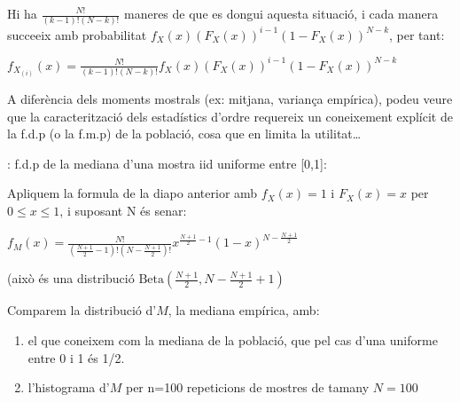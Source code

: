 \documentclass[letterpaper,10pt,english]{sphinxmanual}
\let\sphinxpxdimen\pdfpxdimen\else\newdimen\sphinxpxdimen
\begin{document}
Hi ha \(\frac{N!}{(k-1)!(N-k)!}\) maneres de que es dongui
aquesta situació, i cada manera succeeix amb probabilitat
\(f_X(x)\left(F_X(x)\right)^{i-1}\left(1 - F_X(x)\right)^{N-k}\),
per tant:

\(f_{X_{(i)}}(x) = \frac{N!}{(k-1)!(N-k)!} f_X(x)\left(F_X(x)\right)^{i-1}\left(1 - F_X(x)\right)^{N-k}\)

A diferència dels moments mostrals (ex: mitjana, variança empírica),
podeu veure que la caracterització dels estadístics d’ordre
requereix un coneixement explícit de la f.d.p (o la f.m.p) de la població,
cosa que en limita la utilitat…

: f.d.p de la mediana d’una mostra iid uniforme entre {[}0,1{]}:

Apliquem la formula de la diapo anterior amb \(f_X(x) = 1\) i \(F_X(x) = x\) per \(0 \leq x \leq 1\),
i suposant N és senar:

\(f_{M}(x) = \frac{N!}{(\frac{N+1}{2}-1)!(N-\frac{N+1}{2})!} x^{\frac{N+1}{2}-1}\left(1 - x\right)^{N-\frac{N+1}{2}}\)

(això és una distribució \(\mbox{Beta}(\frac{N+1}{2}, N - \frac{N+1}{2} + 1)\)

Comparem la distribució d’\(M\), la mediana empírica, amb:
\begin{enumerate}
%
\item {} 
el que coneixem com la mediana de la població, que pel cas d’una uniforme entre 0 i 1 és 1/2.

\item {} 
l’histograma d’\(M\) per n=100 repeticions de mostres de tamany \(N=100\)

\end{enumerate}

\noindent{\hspace*{\fill}\sphinxincludegraphics[height=250\sphinxpxdimen]{{uniform_median}.png}\hspace*{\fill}}
\end{document}
